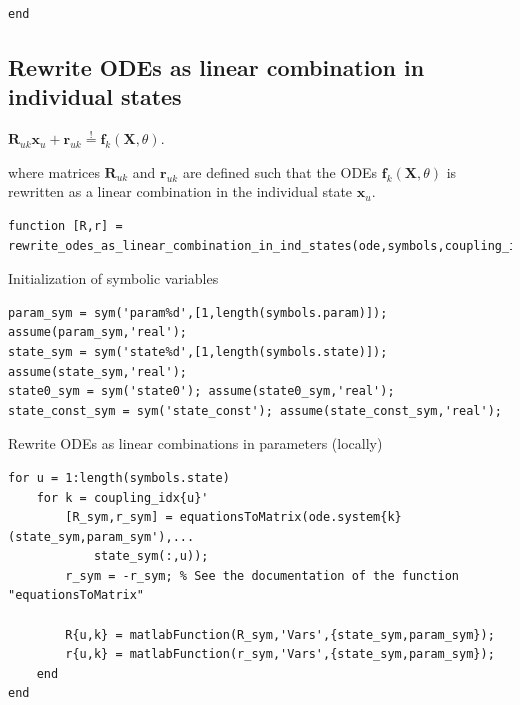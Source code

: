 \color{black}
\color{RoyalPurple}\begin{verbatim}
end
\end{verbatim}
\color{black}
\begin{par}
\section{ Rewrite ODEs as linear combination in individual states }
\end{par} \vspace{1em}
\begin{par}
$\mathbf{R}_{uk} \mathbf{x}_u + \mathbf{r}_{uk} \stackrel{!}{=} \mathbf{f}_k(\mathbf{X},\theta)$.
\end{par} \vspace{1em}
\begin{par}
where matrices $\mathbf{R}_{uk}$ and $\mathbf{r}_{uk}$ are defined such that the ODEs $\mathbf{f}_k(\mathbf{X},\theta)$ is rewritten as a linear combination in the individual state $\mathbf{x}_u$.
\end{par} \vspace{1em}
\color{RoyalPurple}\begin{verbatim}
function [R,r] = rewrite_odes_as_linear_combination_in_ind_states(ode,symbols,coupling_idx)
\end{verbatim}
\color{black}
\begin{par}
Initialization of symbolic variables
\end{par} \vspace{1em}
\color{RoyalPurple}\begin{verbatim}
param_sym = sym('param%d',[1,length(symbols.param)]); assume(param_sym,'real');
state_sym = sym('state%d',[1,length(symbols.state)]); assume(state_sym,'real');
state0_sym = sym('state0'); assume(state0_sym,'real');
state_const_sym = sym('state_const'); assume(state_const_sym,'real');
\end{verbatim}
\color{black}
\begin{par}
Rewrite ODEs as linear combinations in parameters (locally)
\end{par} \vspace{1em}
\color{RoyalPurple}\begin{verbatim}
for u = 1:length(symbols.state)
    for k = coupling_idx{u}'
        [R_sym,r_sym] = equationsToMatrix(ode.system{k}(state_sym,param_sym'),...
            state_sym(:,u));
        r_sym = -r_sym; % See the documentation of the function "equationsToMatrix"

        R{u,k} = matlabFunction(R_sym,'Vars',{state_sym,param_sym});
        r{u,k} = matlabFunction(r_sym,'Vars',{state_sym,param_sym});
    end
end
\end{verbatim}
